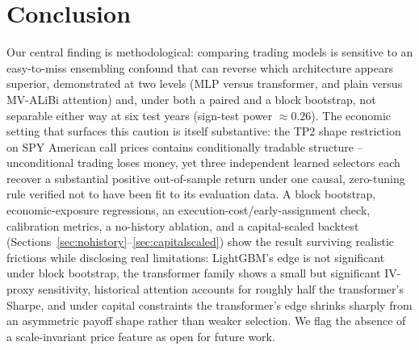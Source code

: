 \documentclass[sigconf,review,anonymous]{acmart}
\begin{document}
\section{Conclusion}
Our central finding is methodological: comparing trading models is sensitive to an easy-to-miss ensembling confound that can reverse which architecture appears superior, demonstrated at two levels (MLP versus transformer, and plain versus MV-ALiBi attention) and, under both a paired and a block bootstrap, not separable either way at six test years (sign-test power $\approx0.26$). The economic setting that surfaces this caution is itself substantive: the TP2 shape restriction on SPY American call prices contains conditionally tradable structure -- unconditional trading loses money, yet three independent learned selectors each recover a substantial positive out-of-sample return under one causal, zero-tuning rule verified not to have been fit to its evaluation data. A block bootstrap, economic-exposure regressions, an execution-cost/early-assignment check, calibration metrics, a no-history ablation, and a capital-scaled backtest (Sections~\ref{sec:nohistory}--\ref{sec:capitalscaled}) show the result surviving realistic frictions while disclosing real limitations: LightGBM's edge is not significant under block bootstrap, the transformer family shows a small but significant IV-proxy sensitivity, historical attention accounts for roughly half the transformer's Sharpe, and under capital constraints the transformer's edge shrinks sharply from an asymmetric payoff shape rather than weaker selection. We flag the absence of a scale-invariant price feature as open for future work.
\end{document}
